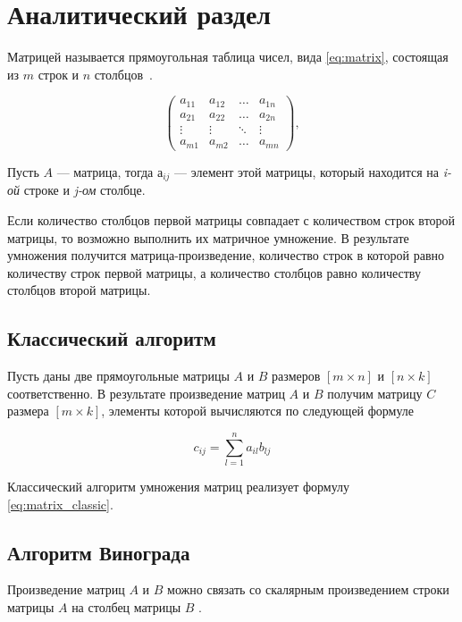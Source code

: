 \chapter{Аналитический раздел}

Матрицей называется прямоугольная таблица чисел, вида \eqref{eq:matrix}, состоящая из $m$ строк и $n$ столбцов~\cite{matrix}.

\begin{equation}
	\label{eq:matrix}
	\begin{pmatrix}
		a_{11} & a_{12} & \ldots & a_{1n}\\
		a_{21} & a_{22} & \ldots & a_{2n}\\
		\vdots & \vdots & \ddots & \vdots\\
		a_{m1} & a_{m2} & \ldots & a_{mn}
	\end{pmatrix},
\end{equation}

Пусть $A$ --- матрица, тогда $а_{ij}$ --- элемент этой матрицы, который находится на \textit{i-ой} строке и \textit{j-ом} столбце.

Если количество столбцов первой матрицы совпадает с количеством строк второй матрицы, то возможно выполнить их матричное умножение.
В результате умножения получится матрица-произведение, количество строк в которой равно количеству строк первой матрицы, а количество столбцов равно количеству столбцов второй матрицы.

\section{Классический алгоритм}

Пусть даны две прямоугольные матрицы $A$ и $B$ размеров $[m \times n]$ и $[n \times k]$ соответственно. В результате произведение матриц $A$ и $B$ получим матрицу $C$ размера $[m \times k]$, элементы которой вычисляются по следующей формуле

\begin{equation}
	\label{eq:matrix_classic}
	c_{ij} = \sum_{l=1}^{n}a_{il}b_{lj}
\end{equation}

Классический алгоритм умножения матриц реализует формулу \eqref{eq:matrix_classic}.

\section{Алгоритм Винограда}

Произведение матриц $A$ и $B$ можно связать со скалярным  произведением строки матрицы $A$ на столбец матрицы $B$ \cite{book_vinograd}.

